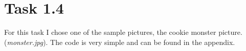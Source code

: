 \section{Task 1.4}
For this task I chose one of the sample pictures, the cookie monster
picture. (\textit{monster.jpg}). The code is very simple and can be found in the
appendix.

